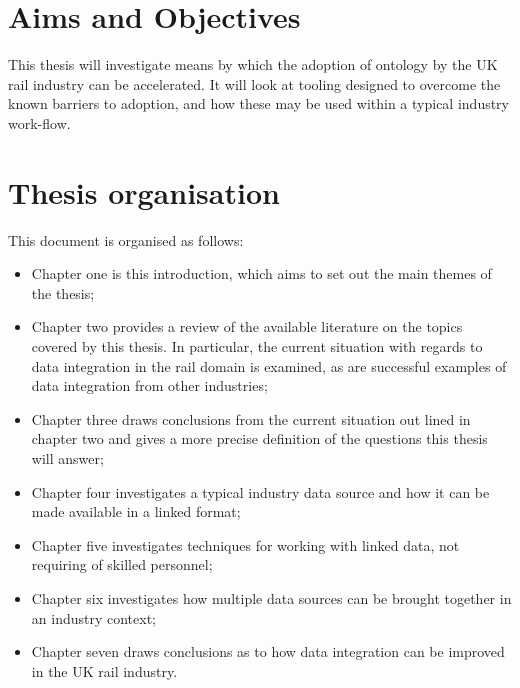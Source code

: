 \section{Aims and Objectives}
This thesis will investigate means by which the adoption of ontology by the UK rail industry can be accelerated. It will look at tooling designed to overcome the known barriers to adoption, and how these may be used within a typical industry work-flow.

\section{Thesis organisation}
This document is organised as follows:

\begin{itemize}
	\item Chapter one is this introduction, which aims to set out the main themes of the thesis;
	\item Chapter two provides a review of the available literature on the topics covered by this thesis. In particular, the current situation with regards to data integration in the rail domain is examined, as are successful examples of data integration from other industries;
	\item Chapter three draws conclusions from the current situation out lined in chapter two and gives a more precise definition of the questions this thesis will answer;
	\item Chapter four investigates a typical industry data source and how it can be made available in a linked format;
	\item Chapter five investigates techniques for working with linked data, not requiring of skilled personnel;
	\item Chapter six investigates how multiple data sources can be brought together in an industry context;
	\item Chapter seven draws conclusions as to how data integration can be improved in the UK rail industry.
\end{itemize}